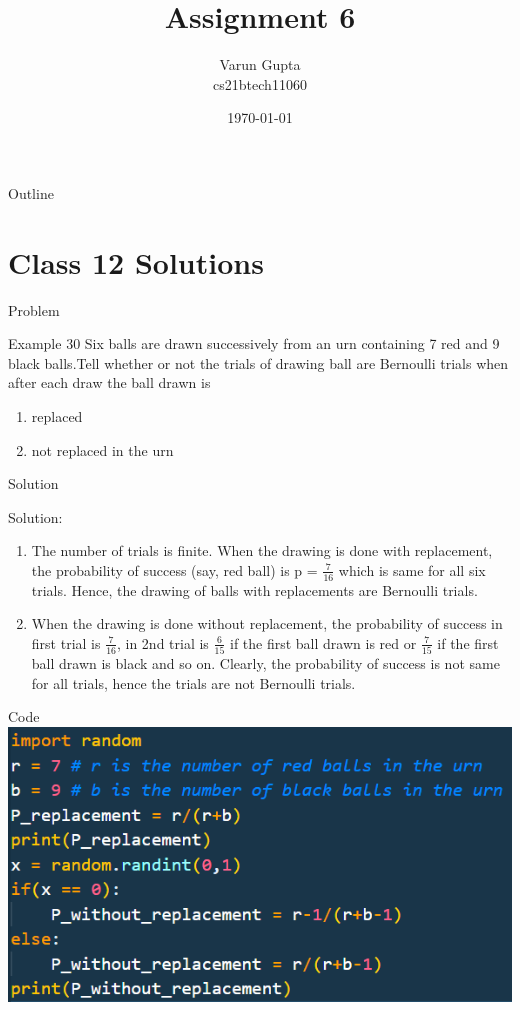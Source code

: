 \documentclass{beamer}
\title{Assignment 6}
\author{Varun Gupta \\ cs21btech11060}
\date{\today}
\begin{document}
\begin{frame}
    \titlepage
\end{frame}

\logo{}


\begin{frame}{Outline}
    \tableofcontents
\end{frame}
\section{Class 12 Solutions}
\begin{frame}{Problem}
    \begin{block}{Example 30}
        Six balls are drawn successively from an urn containing 7 red and 9 black balls.Tell whether or not the trials of drawing ball are Bernoulli trials when after each draw the ball drawn is
        \begin{enumerate}
            \item replaced
            \item not replaced in the urn
        \end{enumerate}
    \end{block}
\end{frame}
\begin{frame}{Solution}
    \begin{block}{Solution:}
        \begin{enumerate}
            \item  The number of trials is finite. When the drawing is done with replacement, the
                  probability of success (say, red ball) is p = $\frac{7}{16}$ which is same for all six trials. Hence, the drawing of balls with replacements are Bernoulli trials.
            \item When the drawing is done without replacement, the probability of success in first trial is $\frac{7}{16}$, in 2nd trial is $\frac{6}{15}$ if the first ball drawn is red or $\frac{7}{15}$ if the first ball drawn is black and so on. Clearly, the probability of success is not same for all trials, hence the trials are not Bernoulli trials.
        \end{enumerate}
    \end{block}
\end{frame}
\begin{frame}{Code}
        \includegraphics{figures/fig.png}
\end{frame}
\end{document}
